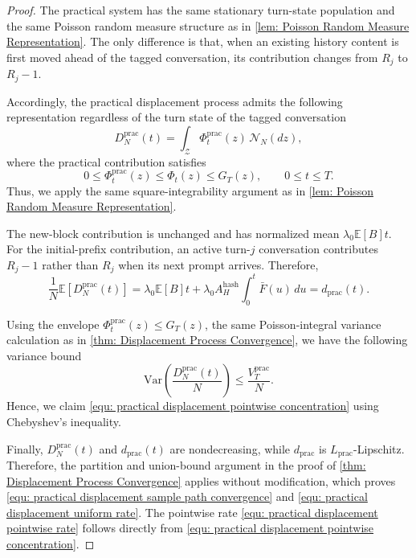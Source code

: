 \documentclass{article}
\theoremstyle{definition}
\newcommand{\E}{\mathbb E}
\begin{document}
\begin{proof}
The practical system has the same stationary turn-state population and the same Poisson random measure structure as in \cref{lem: Poisson Random Measure Representation}. The only difference is that, when an existing history content is first moved ahead of the tagged conversation, its contribution changes from $R_j$ to $R_j-1$.

Accordingly, the practical displacement process admits the following  representation regardless of the turn state of the tagged conversation 
\begin{equation*}
    D_N^{\mathrm{prac}}(t)=\int_{\mathcal Z}\Phi_t^{\mathrm{prac}}(z)\,\mathcal N_N(dz),
\end{equation*}
where the practical contribution satisfies
\begin{equation*}
    0\leq\Phi_t^{\mathrm{prac}}(z)\leq\Phi_t(z)\leq G_T(z), \qquad 0\leq t\leq T.
\end{equation*}
Thus, we apply the same square-integrability argument as in \cref{lem: Poisson Random Measure Representation}.

The new-block contribution is unchanged and has normalized mean $\lambda_0\E[B]t$. For the initial-prefix contribution, an active turn-$j$ conversation contributes $R_j-1$ rather than $R_j$ when its next prompt arrives. Therefore,
\begin{equation*}
    \frac{1}{N}\E[D_N^{\mathrm{prac}}(t)]
    =\lambda_0\E[B]t+\lambda_0A_H^{\mathrm{hash}}\int_0^t\bar F(u)\,du
    =d_{\mathrm{prac}}(t).
\end{equation*}

Using the envelope $\Phi_t^{\mathrm{prac}}(z)\leq G_T(z)$, the same Poisson-integral variance calculation as in \cref{thm: Displacement Process Convergence}, we have the following variance bound
\begin{equation*}
    \text{Var}\left(\frac{D_N^{\mathrm{prac}}(t)}{N}\right)
    \leq\frac{V_T^{\mathrm{prac}}}{N}.
\end{equation*}
Hence, we claim \eqref{equ: practical displacement pointwise concentration} using Chebyshev's inequality.

Finally, $D_N^{\mathrm{prac}}(t)$ and $d_{\mathrm{prac}}(t)$ are nondecreasing, while $d_{\mathrm{prac}}$ is $L_{\mathrm{prac}}$-Lipschitz. Therefore, the partition and union-bound argument in the proof of \cref{thm: Displacement Process Convergence} applies without modification, which proves \eqref{equ: practical displacement sample path convergence} and \eqref{equ: practical displacement uniform rate}. The pointwise rate \eqref{equ: practical displacement pointwise rate} follows directly from \eqref{equ: practical displacement pointwise concentration}.
\end{proof}
\end{document}
